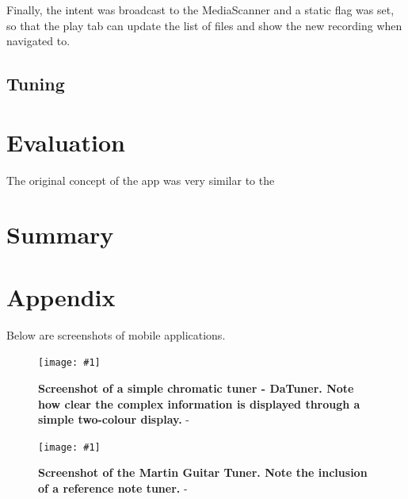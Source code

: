 \documentclass[conference]{acmsiggraph}
\newcommand{\figuremacroW}[4]{
	\begin{figure}[H] %
		\centering
		\texttt{[image: \#1]}
		\caption[#2]{\textbf{#2} - #3}
		\label{fig:#1}
	\end{figure}
}
\begin{document}
Finally, the intent was broadcast to the MediaScanner and a static flag was set, so that the play tab can update the list of files and show the new recording when navigated to. 

\subsection{Tuning}




\section{Evaluation}



The original concept of the app was very similar to the 

\section{Summary}







\clearpage
\newpage

\section{Appendix}

Below are screenshots of mobile applications.

\figuremacroW
{daTune}
{Screenshot of a simple chromatic tuner - DaTuner. Note how clear the complex information is displayed through a simple two-colour display.}
{\protect\cite{DaTune}}
{1.0}

\figuremacroW
{martinTuner}
{Screenshot of the Martin Guitar Tuner. Note the inclusion of a reference note tuner.}
{\protect\cite{Martin}}
{1.0}
\end{document}
